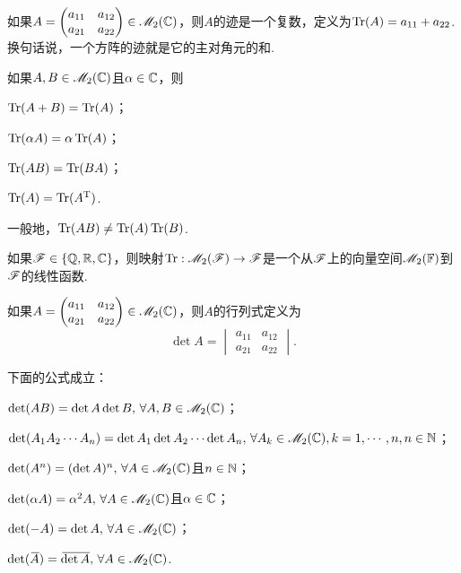   \begin{definition}
    如果$A=\begin{pmatrix}
      a_{11} & a_{12} \\
      a_{21} & a_{22}
    \end{pmatrix}\in\mathscr M_2(\mathbb C)$，则$A$的{\kaishu 迹}是一个复数，定义为$\operatorname{Tr}(A)=a_{11}+a_{22}$. 换句话说，一个方阵的迹就是它的主对角元的和.
  \end{definition}

  \begin{property}
    如果$A,B\in\mathscr M_2(\mathbb C)$且$\alpha\in \mathbb C$，则
    \begin{enum}
      \item $\operatorname{Tr}(A+B)=\operatorname{Tr}(A)$；
      \item $\operatorname{Tr}(\alpha A)=\alpha \operatorname{Tr}(A)$；
      \item $\operatorname{Tr}(AB)=\operatorname{Tr}(BA)$；
      \item $\operatorname{Tr}(A)=\operatorname{Tr}(A^{\mathrm T})$.
    \end{enum}
  \end{property}
  \begin{nota}
    一般地，$\operatorname{Tr}(AB)\ne\operatorname{Tr}(A)\operatorname{Tr}(B)$.
  \end{nota}
  \begin{remark}
    如果$\mathscr F\in\{\mathbb Q,\mathbb R,\mathbb C\}$，则映射$\operatorname{Tr}:\mathscr M_2(\mathscr F)\to\mathscr F$是一个从$\mathscr F$上的向量空间$\mathscr M_2(\mathbb F)$到$\mathscr F$的{\kaishu 线性函数}.
  \end{remark}

  \begin{definition}
    如果$A=\begin{pmatrix}
      a_{11} & a_{12} \\
      a_{21} & a_{22}
    \end{pmatrix}\in\mathscr M_2(\mathbb C)$，则$A$的{\kaishu 行列式}定义为
    \[
      \det A = \begin{vmatrix}
        a_{11} & a_{12} \\
        a_{21} & a_{22}
      \end{vmatrix}.
    \]
  \end{definition}

  \begin{property}
    下面的公式成立：
    \begin{enum}
      \item $\det(AB)=\det A\det B,\,\forall A,B\in\mathscr M_2(\mathbb C)$；
      \item $\det(A_1A_2\cdots A_n)=\det A_1\det A_2\cdots\det A_n,\,\forall A_k\in\mathscr M_2(\mathbb C),k=1,\cdots,n,n\in\mathbb N$；
      \item $\det(A^n)=(\det A)^n,\,\forall A\in\mathscr M_2(\mathbb C)$且$n\in\mathbb N$；
      \item $\det(\alpha A)=\alpha^2A,\,\forall A\in\mathscr M_2(\mathbb C)$且$\alpha\in \mathbb C$；
      \item $\det(-A)=\det A,\,\forall A\in\mathscr M_2(\mathbb C)$；
      \item $\det({}\mkern2mu\overline{\mkern-2muA})={}\mkern2mu\overline{\mkern-2mu\det A},\,\forall A\in\mathscr M_2(\mathbb C)$.
    \end{enum}
  \end{property}

